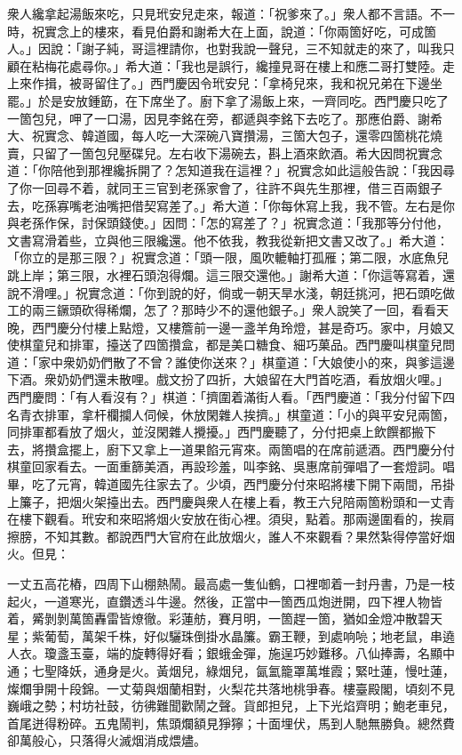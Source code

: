 衆人纔拿起湯飯來吃，只見玳安兒走來，報道：「祝爹來了。」{}衆人都不言語。{}不一時，祝實念上的樓來，看見伯爵和謝希大在上面，說道：「你兩箇好吃，可成箇人。」因說：「謝子純，哥這裡請你，也對我說一聲兒，三不知就走的來了，叫我只顧在粘梅花處尋你。」希大道：「我也是誤行，纔撞見哥在樓上和應二哥打雙陸。走上來作揖，被哥留住了。」西門慶因令玳安兒：「拿椅兒來，我和祝兄弟在下邊坐罷。」於是安放鍾筯，在下席坐了。廚下拿了湯飯上來，一齊同吃。西門慶只吃了一箇包兒，呷了一口湯，因見李銘在旁，都遞與李銘下去吃了。那應伯爵、謝希大、祝實念、韓道國，每人吃一大深碗八寶攢湯，三箇大包子，還零四箇桃花燒賣，只留了一箇包兒壓碟兒。左右收下湯碗去，斟上酒來飲酒。希大因問祝實念道：「你陪他到那裡纔拆開了？怎知道我在這裡？」祝實念如此這般告說：「我因尋了你一回尋不着，就同王三官到老孫家會了，往許不與先生{}那裡，借三百兩銀子去，吃孫寡嘴老油嘴把借契寫差了。」希大道：「你每休寫上我，我不管。左右是你與老孫作保，討保頭錢使。」因問：「怎的寫差了？」祝實念道：「我那等分付他，文書寫滑着些，立與他三限纔還。他不依我，教我從新把文書又改了。」希大道：「你立的是那三限？」祝實念道：「頭一限，風吹轆軸打孤雁；第二限，水底魚兒跳上岸；第三限，水裡石頭泡得爛。這三限交還他。」謝希大道：「你這等寫着，還說不滑哩。」祝實念道：「你到說的好，倘或一朝天旱水淺，朝廷挑河，把石頭吃做工的兩三鐝頭砍得稀爛，怎了？那時少不的還他銀子。」{}衆人說笑了一回，看看天晚，西門慶分付樓上點燈，又樓簷前一邊一盞羊角玲燈，甚是奇巧。家中，月娘又使棋童兒和排軍，擡送了四箇攢盒，都是美口糖食、細巧菓品。西門慶叫棋童兒問道：「家中衆奶奶們散了不曾？誰使你送來？」棋童道：「大娘使小的來，與爹這邊下酒。衆奶奶們還未散哩。戲文扮了四折，大娘留在大門首吃酒，看放烟火哩。」西門慶問：「有人看沒有？」棋道：「擠圍着滿街人看。「西門慶道：「我分付留下四名青衣排軍，拿杆欄攔人伺候，休放閑雜人挨擠。」棋童道：「小的與平安兒兩箇，同排軍都看放了烟火，並沒閑雜人攪擾。」西門慶聽了，分付把桌上飲饌都搬下去，將攢盒擺上，廚下又拿上一道果餡元宵來。兩箇唱的在席前遞酒。西門慶分付棋童回家看去。一面重篩美酒，再設珍羞，叫李銘、吳惠席前彈唱了一套燈詞。唱畢，吃了元宵，韓道國先往家去了。{}少頃，西門慶分付來昭將樓下開下兩間，吊掛上簾子，把烟火架擡出去。西門慶與衆人在樓上看，教王六兒陪兩箇粉頭和一丈青在樓下觀看。玳安和來昭將烟火安放在街心裡。須臾，點着。那兩邊圍看的，挨肩擦膀，不知其數。都說西門大官府在此放烟火，誰人不來觀看？果然紮得停當好烟火。但見：

\begin{myquote}
一丈五高花樁，四周下山棚熱鬧。最高處一隻仙鶴，口裡啣着一封丹書，乃是一枝起火，一道寒光，直鑽透斗牛邊。然後，正當中一箇西瓜炮迸開，四下裡人物皆着，觱剝剝萬箇轟雷皆燎徹。彩蓮舫，賽月明，一箇趕一箇，猶如金燈冲散碧天星；紫葡萄，萬架千株，好似驪珠倒掛水晶簾。霸王鞭，到處响喨；地老鼠，串遶人衣。瓊盞玉臺，端的旋轉得好看；銀蛾金彈，施逞巧妙難移。八仙捧壽，名顯中通；七聖降妖，通身是火。黃烟兒，綠烟兒，氤氳籠罩萬堆霞；緊吐蓮，慢吐蓮，燦爛爭開十段錦。一丈菊與烟蘭相對，火梨花共落地桃爭春。樓臺殿閣，頃刻不見巍峨之勢；村坊社鼓，彷彿難聞歡鬧之聲。貨郎担兒，上下光焰齊明；鮑老車兒，首尾迸得粉碎。五鬼鬧判，焦頭爛額見猙獰；十面埋伏，馬到人馳無勝負。總然費卻萬般心，只落得火滅烟消成煨燼。
\end{myquote}

